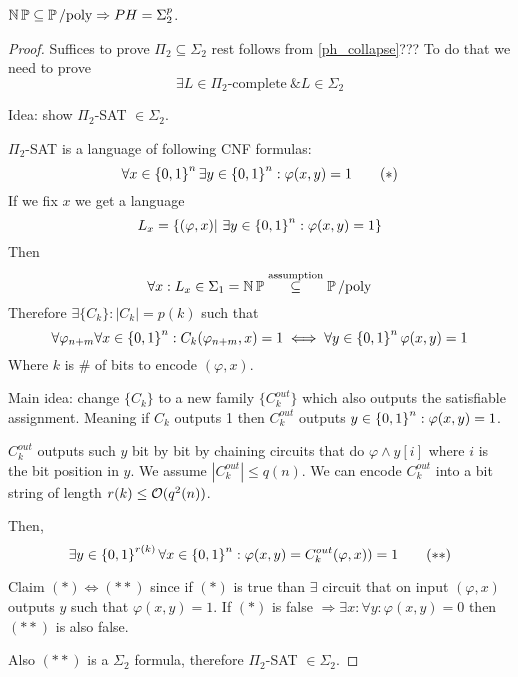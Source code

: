 \begin{theorem}
	$\operatorname{\operatorname{\mathbb{N}}\mathbb{P}} \subseteq \operatorname{\operatorname{\mathbb{P}}/poly} \Rightarrow PH = \Sigma_2^p$.
\end{theorem}
\begin{proof}
	Suffices to prove $\Pi_2 \subseteq \Sigma_2$ rest follows from \cref{ph_collapse}???
	To do that we need to prove
	\[\exists L \in \Pi_2\text{-complete}\ \& L \in \Sigma_2 \]

	Idea: show $\Pi_2$-SAT $\in \Sigma_2$.

	$\Pi_2$-SAT is a language of following CNF formulas:
	\begin{equation}
		\forall x \in \operatorname{\{ 0, 1 \}}^n \exists y \in \operatorname{\{ 0, 1 \}}^n: \varphi(x, y) = 1
		\tag{$*$}
	\end{equation}
	If we fix $x$ we get a language
	\[ L_x = \{ (\varphi, x) |\ \exists y \in \szo^n: \varphi(x, y) = 1 \} \]
	Then
	\[ \forall x: L_x \in \Sigma_1 = \operatorname{\operatorname{\mathbb{N}}\mathbb{P}} \stackrel{\text{assumption}}{\subseteq} \operatorname{\operatorname{\mathbb{P}}/poly} \]
	Therefore $\exists \{ C_k \}: |C_k| = p(k)$ such that
	\[ \forall \varphi_{n + m} \forall x \in \operatorname{\{ 0, 1 \}}^n: C_k(\varphi_{n + m}, x) = 1 \iff \forall y \in \operatorname{\{ 0, 1 \}}^n \varphi(x, y) = 1 \]
	Where $k$ is \# of bits to encode $(\varphi, x)$.

	Main idea: change $\{ C_k \}$ to a new family $\{ C_k^{out} \}$ which also outputs the satisfiable assignment.
	Meaning if $C_k$ outputs 1 then $C_k^{out}$ outputs $y \in \operatorname{\{ 0, 1 \}}^n: \varphi(x, y) = 1$.

	$C_k^{out}$ outputs such $y$ bit by bit by chaining circuits that do $\varphi \land y[i]$ where $i$ is the bit position in $y$.
	We assume $|C_k^{out}| \leq q(n)$.
	We can encode $C_k^{out}$ into a bit string of length $r(k) \leq \mathcal{O}(q^2(n))$.

	Then,
	\begin{equation}
		\exists y \in \operatorname{\{ 0, 1 \}}^{r(k)} \forall x \in \operatorname{\{ 0, 1 \}}^n: \varphi(x, y) = C_k^{out}(\varphi, x)) = 1
	\tag{$**$}
	\end{equation}

	Claim $(*) \iff (**)$ since if $(*)$ is true than $\exists$ circuit that on input $(\varphi, x)$ outputs $y$ such that $\varphi(x, y) = 1$.
	If $(*)$ is false $\Rightarrow \exists x: \forall y: \varphi(x, y) = 0$ then $(**)$ is also false.

	Also $(**)$ is a $\Sigma_2$ formula, therefore $\Pi_2$-SAT $\in \Sigma_2$.

\end{proof}
